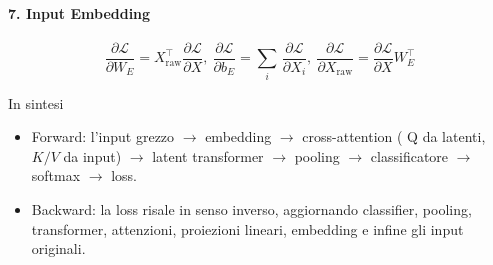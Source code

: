 \documentclass[
  11pt,
]{article}
\begin{document}
\paragraph{7. Input Embedding}

\[\frac{\partial\mathcal{L}}{\partial W_{E}} = X_{\text{raw}}^{\top}\frac{\partial\mathcal{L}}{\partial X},\ \frac{\partial\mathcal{L}}{\partial b_{E}} = \sum_{i}^{}\,\frac{\partial\mathcal{L}}{\partial X_{i}},\ \frac{\partial\mathcal{L}}{\partial X_{\text{raw}}} = \frac{\partial\mathcal{L}}{\partial X}W_{E}^{\top}\]

In sintesi

\begin{itemize}
\item
  Forward: l'input grezzo \(\rightarrow\) embedding
  \(\rightarrow\) cross-attention ( Q da latenti, \(K/V\) da input)
  \(\rightarrow\) latent transformer \(\rightarrow\) pooling
  \(\rightarrow\) classificatore \(\rightarrow\) softmax \(\rightarrow\)
  loss.
\item
  Backward: la loss risale in senso inverso, aggiornando classifier,
  pooling, transformer, attenzioni, proiezioni lineari, embedding e
  infine gli input originali.
\end{itemize}
\end{document}
